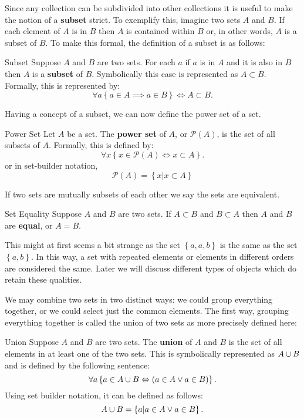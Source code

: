 Since any collection can be subdivided into other collections it is useful to make the notion of a \textbf{subset} strict.
To exemplify this, imagine two sets $A$ and $B$.
If each element of $A$ is in $B$ then $A$ is contained within $B$ or, in other words, $A$ is a subset of $B$.
To make this formal, the definition of a subset is as follows:
\begin{defn}{Subset}
  Suppose $A$ and $B$ are two sets.
  For each $a$ if $a$ is in $A$ and it is also in $B$ then $A$ is a \textbf{subset} of $B$.
  Symbolically this case is represented as $A \subset B$.
  Formally, this is represented by:
  $$
    \forall a \left\{ a \in A \implies a \in B \right\}  \Leftrightarrow A \subset B.
  $$
\end{defn}

Having a concept of a subset, we can now define the power set of a set.
\begin{defn}{Power Set}
  Let $A$ be a set.
  The \textbf{power set} of $A$, or $\mathcal{P}(A)$, is the set of all subsets of $A$.
  Formally, this is defined by:
  $$
    \forall x \left\{ x \in \mathcal{P}(A) \iff x \subset A \right\}.
  $$
  or in set-builder notation,
  $$
    \mathcal{P}(A) = \left\{x | x \subset A \right\}
  $$
\end{defn}

If two sets are mutually subsets of each other we say the sets are equivalent.
\begin{defn}{Set Equality}
  Suppose $A$ and $B$ are two sets.
  If $A \subset B$ and $B \subset A$ then $A$ and $B$ are \textbf{equal}, or $A = B$.
\end{defn}
This might at first seems a bit strange as the set $\left\{ a, a, b\right\}$ is the same as the set $\left\{ a, b \right\}$.
In this way, a set with repeated elements or elements in different orders are considered the same.
Later we will discuss different types of objects which do retain these qualities.

We may combine two sets in two distinct ways: we could group everything together, or we could select just the common elements.
The first way, grouping everything together is called the union of two sets as more precisely defined here:
\begin{defn}{Union}
  Suppose $A$ and $B$ are two sets.
  The \textbf{union} of $A$ and $B$ is the set of all elements in at least one of the two sets.
  This is symbolically represented as $A \cup B$ and is defined by the following sentence:
  $$
  \forall a \left\{ a \in A \cup B \Leftrightarrow (a \in A \vee a \in B) \right\}.
  $$
  Using set builder notation, it can be defined as follows:
  $$
    A \cup B =  \left\{ a | a \in A \vee a \in B \right\}.
  $$
\end{defn}

